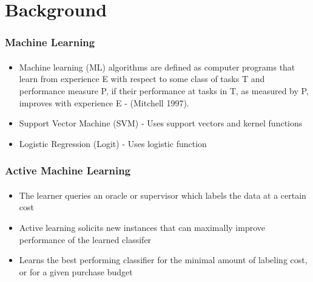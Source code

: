 \documentclass{beamer}
\begin{document}
\section{Background}
\begin{frame}
    \frametitle{Machine Learning}
    \framesubtitle{}
\begin{itemize}
  \item Machine learning (ML) algorithms are defined as computer programs that learn from experience E
with respect to some class of tasks T and performance measure P, if their performance at
tasks in T, as measured by P, improves with experience E - (Mitchell 1997).
  \item Support Vector Machine (SVM) - Uses support vectors and kernel functions %
  \item Logistic Regression (Logit) - Uses logistic function %
\end{itemize}
\end{frame}
\begin{frame}
    \frametitle{Active Machine Learning}
    \framesubtitle{}
\begin{itemize}
  \item The learner queries an oracle or supervisor which labels the data at a certain cost
  \item Active learning solicits new instances that can maximally improve performance of the learned classifer
  \item Learns the best performing classifier for the minimal amount of labeling cost,
  or for a given purchase budget
\end{itemize}
\end{frame}
\end{document}
